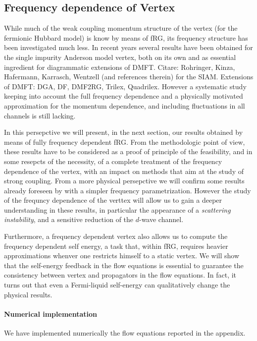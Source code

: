 \subsection{Frequency dependence of Vertex}


While much of the weak coupling momentum structure of the vertex (for the fermionic Hubbard model) is know by means of fRG, its frequency structure has been investigated much less. 
In recent years several results have been obtained for the single impurity Anderson model vertex, both on its own and as essential ingredient for diagrammatic extensions of DMFT. 
Citare: Rohringer, Kinza, Hafermann, Karrasch, Wentzell (and references therein) for the SIAM. Extensions of DMFT: DGA, DF, DMF2RG, Trilex, Quadrilex. 
However a systematic study keeping into account the full frequency dependence and a physically motivated approximation for the momentum dependence, and including fluctuations in all channels is still lacking.

In this persepctive we will present, in the next section, our results obtained by means of fully frequency dependent fRG.
From the methodologic point of view, these results have to be considered as a proof of principle of the feasibility, and in some resepcts of the necessity, of a complete treatment of the frequency dependence of the vertex, with an impact on methods that aim at the study of strong coupling.
From a more physical persepctive we will confirm some results already foreseen by  with a simpler frequency parametrization. However the study of the frequncy dependence of the verttex will allow us to gain a deeper understanding in these results, in particular the appearance of a \textit{scattering instability}, and a sensitive reduction of the $d$-wave channel. 

Furthermore, a frequency dependent vertex also allows us to compute the frequency dependent self energy, a task that, within fRG, requires heavier approximations whenver one restricts himself to a static vertex.  
We will show that the self-energy feedback in the flow equations is essential to guarantee the consistency between vertex and propagators in the flow equations.
In fact, it turns out that even a Fermi-liquid self-energy can qualitatively change the physical results. 

\paragraph*{Numerical implementation}
We have implemented numerically the flow equations reported in the appendix. 


